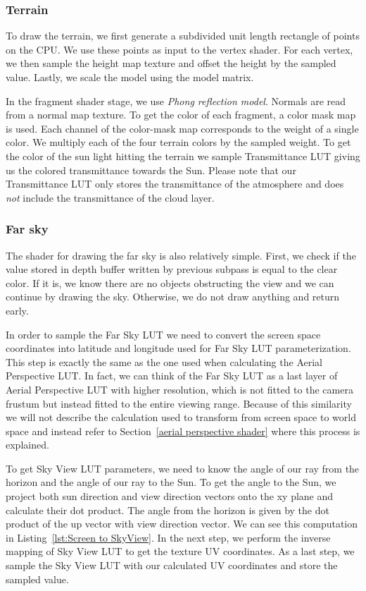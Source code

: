 \documentclass{ctuthesis}
\begin{document}
\subsubsection{Terrain}
To draw the terrain, we first generate a subdivided unit length rectangle of points on the CPU. We use
these points as input to the vertex shader. For each vertex, we then sample the height map texture and offset 
the height by the sampled value. Lastly, we scale the model using the model matrix.

In the fragment shader stage, we use \textit{Phong reflection model}. Normals are read from a normal map
texture. To get the color of each fragment, a color mask map is used. Each channel of the color-mask map
corresponds to the weight of a single color. We multiply each of the four terrain colors by the sampled weight.
To get the color of the sun light hitting the terrain we sample Transmittance LUT giving us the colored 
transmittance towards the Sun. Please note that our Transmittance LUT only stores the transmittance
of the atmosphere and does \textit{not} include the transmittance of the cloud layer.

\subsubsection{Far sky}
The shader for drawing the far sky is also relatively simple. First, we check if the value stored in depth buffer
written by previous subpass is equal to the clear color. If it is, we know there are no objects obstructing 
the view and we can continue by drawing the sky. Otherwise, we do not draw anything and return early.

In order to sample the Far Sky LUT we need to convert the screen space coordinates into latitude and 
longitude used for Far Sky LUT parameterization. This step is exactly the same as the one used when
calculating the Aerial Perspective LUT. In fact, we can think of the Far Sky LUT as a last layer of Aerial
Perspective LUT with higher resolution, which is not fitted to the camera frustum but instead fitted
to the entire viewing range. Because of this similarity we will not describe the calculation used
to transform from screen space to world space and instead refer to 
Section~\ref{aerial perspective shader} where this process is explained.

To get Sky View LUT parameters, we need to know the angle of our ray from the horizon and the angle of 
our ray to the Sun. To get the angle to the Sun, we project both sun direction and view direction vectors onto
the xy plane and calculate their dot product. The angle from the horizon is given by the dot product
of the up vector with view direction vector. We can see this computation in Listing~\ref{lst:Screen to SkyView}. 
In the next step, we perform the inverse mapping of Sky View LUT to get the texture UV coordinates. As a last
step, we sample the Sky View LUT with our calculated UV coordinates and store the sampled value.
\end{document}
